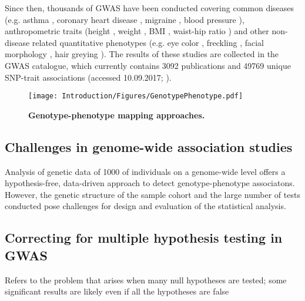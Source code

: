 Since then, thousands of GWAS have been conducted covering common diseases (e.g. asthma \citep{Noguchi201,Pickrell2016}, coronary heart disease \citep{Wild2011,Takeuchi2011,Lu2012}, migraine \citep{Pickrell2016,Gormley2016}, blood pressure \citep{Kato2011,Franceschini2013}), anthropometric traits (height \citep{Lango2010,Wood2014}, weight \citep{Willer2008}, BMI \citep{Speliotes2010,Yang2012}, waist-hip ratio \citep{Lindgren2009,Heid2010}) and other non-disease related quantitative phenotypes (e.g. eye color \citep{Erikson2010,Candille2012,Zhang2013}, freckling \citep{Sulem2008}, facial morphology \citep{Paternoster2012}, hair greying \citep{Adhikari2016}). The results of these studies are collected in the GWAS catalogue, which currently contains \num{3092} publications and \num{49769} unique SNP-trait associations (accessed 10.09.2017; \citep{MacArthur2017}). 


\begin{figure}[hbtp]
	\centering
	\texttt{[image: Introduction/Figures/GenotypePhenotype.pdf]}
	\caption[\textbf{Genotype-phenotype mapping approaches. }]{\textbf{Genotype-phenotype mapping approaches. } } 
	 	\label{fig:genotype-phenotype}
\end{figure}



%



\subsection{Challenges in genome-wide association studies}
Analysis of genetic data of \num{1000} of individuals on a genome-wide level offers a hypothesis-free, data-driven approach to detect genotype-phenotype associatons. However, the genetic structure of the sample cohort and the large number of tests conducted pose challenges for design and evaluation of the statistical analysis. 

\subsection{Correcting for multiple hypothesis testing in GWAS}
Refers to the problem that arises when many null hypotheses are tested; some significant results are likely even if all the hypotheses are false
\label{subsection:multiple-testing}

